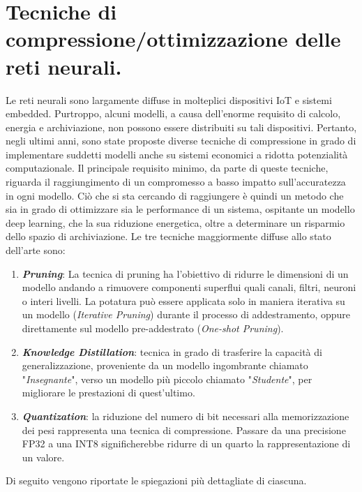 \section{Tecniche di compressione/ottimizzazione delle reti neurali.}
Le reti neurali sono largamente diffuse in molteplici dispositivi IoT e sistemi 
embedded. Purtroppo, alcuni modelli, a causa dell'enorme requisito 
di calcolo, energia e archiviazione, non possono essere distribuiti su tali 
dispositivi. Pertanto, negli ultimi anni, sono state proposte diverse tecniche 
di compressione in grado di implementare suddetti modelli anche su sistemi 
economici a ridotta potenzialità computazionale. Il principale requisito 
minimo, da parte di queste tecniche, riguarda il raggiungimento di un compromesso 
a basso impatto sull'accuratezza in ogni modello. Ciò che si sta 
cercando di raggiungere è quindi un metodo che sia in grado di ottimizzare 
sia le performance di un sistema, ospitante un modello deep learning, che la 
sua riduzione energetica, oltre a determinare un risparmio dello spazio di 
archiviazione. Le tre tecniche maggiormente diffuse allo stato dell'arte sono:
\begin{enumerate}
    \item {\bfseries{\emph{Pruning}}}: La tecnica di pruning ha l'obiettivo di ridurre le dimensioni 
    di un modello andando a rimuovere componenti superflui quali canali, 
    filtri, neuroni o interi livelli. La potatura può essere applicata solo in 
    maniera iterativa su un modello (\emph{Iterative Pruning}) durante il processo 
    di addestramento, oppure direttamente sul modello pre-addestrato (\emph{One-shot Pruning}).
    \item {\bfseries{\emph{Knowledge Distillation}}}: tecnica in grado di trasferire la capacità 
    di generalizzazione, proveniente da un modello ingombrante chiamato 
    "\emph{Insegnante}", verso un modello più piccolo chiamato "\emph{Studente}", per 
    migliorare le prestazioni di quest'ultimo.
    \item {\bfseries{\emph{Quantization}}}: la riduzione del numero di bit necessari 
    alla memorizzazione dei pesi rappresenta una tecnica di compressione. Passare da 
    una precisione FP32 a una INT8 significherebbe ridurre di un quarto 
    la rappresentazione di un valore.
\end{enumerate}
Di seguito vengono riportate le spiegazioni più dettagliate di ciascuna.

